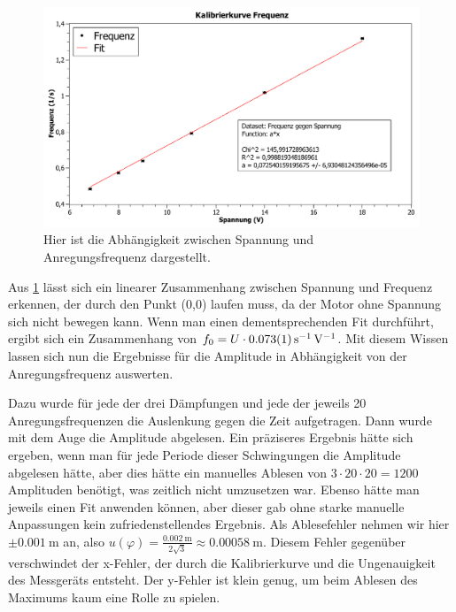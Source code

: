 \documentclass[
	a4paper,
	12pt,
	pagesize,
	ngerman
]{scrartcl}
\begin{document}
	\begin{figure}[htb]
		\includegraphics[width=1\textwidth]{Kalibrierkurve_Graph}
		\centering
		\caption{Hier ist die Abhängigkeit zwischen Spannung und Anregungsfrequenz dargestellt.}
		\label{Kalibirierkurve}
		\centering
	\end{figure}
	Aus \cref{Kalibirierkurve} lässt sich ein linearer Zusammenhang zwischen Spannung und Frequenz erkennen, der durch den Punkt (0,0) laufen muss, da der Motor ohne Spannung sich nicht bewegen kann. Wenn man einen dementsprechenden Fit durchführt, ergibt sich ein Zusammenhang von $ f_0 = U \cdot \SI{0,073 \pm 0,001}{\per \second \per \volt} $. Mit diesem Wissen lassen sich nun die Ergebnisse für die Amplitude in Abhängigkeit von der Anregungsfrequenz auswerten.
	\par
	Dazu wurde für jede der drei Dämpfungen und jede der jeweils 20 Anregungsfrequenzen die Auslenkung gegen die Zeit aufgetragen. Dann wurde mit dem Auge die Amplitude abgelesen. Ein präziseres Ergebnis hätte sich ergeben, wenn man für jede Periode dieser Schwingungen die Amplitude abgelesen hätte, aber dies hätte ein manuelles Ablesen von $3 \cdot 20 \cdot 20 = 1200 $ Amplituden benötigt, was zeitlich nicht umzusetzen war. Ebenso hätte man jeweils einen Fit anwenden können, aber dieser gab ohne starke manuelle Anpassungen kein zufriedenstellendes Ergebnis.
	Als Ablesefehler nehmen wir hier $\pm \SI{0,001}{\meter}$ an, also $ u(\varphi) = \frac{\SI{0,002}{\meter}}{2\sqrt{3}} \approx \SI{0,00058}{\meter} $. Diesem Fehler gegenüber verschwindet der x-Fehler, der durch die Kalibrierkurve und die Ungenauigkeit des Messgeräts entsteht. Der y-Fehler ist klein genug, um beim Ablesen des Maximums kaum eine Rolle zu spielen.
\end{document}
